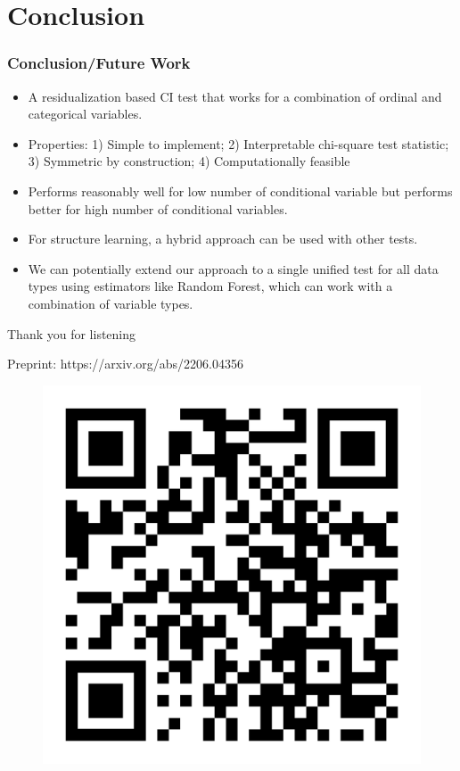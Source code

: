 \documentclass{beamer}
\begin{document}

\section{Conclusion}
\begin{frame}
	\frametitle{Conclusion/Future Work}
	\begin{itemize}
		\setlength\itemsep{1em}
		\item A residualization based CI test that works for a
			combination of ordinal and categorical variables.
		\item Properties: 1) Simple to implement; 2) Interpretable
			chi-square test statistic; 3) Symmetric by
			construction; 4) Computationally feasible
		\item Performs reasonably well for low number of conditional
			variable but performs better for high number of
			conditional variables.
		\item For structure learning, a hybrid approach can be used
			with other tests.
		\item We can potentially extend our approach to a single unified test
			for all data types using estimators like Random Forest, which
			can work with a combination of variable types.
	\end{itemize}
\end{frame}

\begin{frame}
	\begin{center}
		\Huge{Thank you for listening}
	\end{center}
	\begin{center}
		Preprint: https://arxiv.org/abs/2206.04356
		\begin{figure}
			\includegraphics[scale=0.07]{imgs/qr-code.pdf}
		\end{figure}
	\end{center}
\end{frame}
\end{document}
